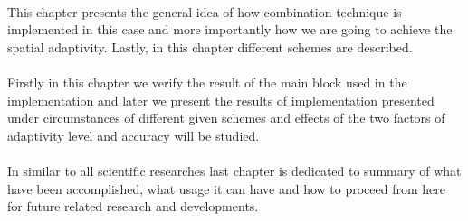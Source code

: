\\
\noindent  This chapter presents the general idea of how combination technique is implemented in this case and more importantly how we are going to achieve the spatial adaptivity. Lastly, in this chapter different schemes are described.  \\

\\
\noindent  Firstly in this chapter we verify the result of the main block used in the implementation and later we present the results of implementation presented under circumstances of different given schemes and effects of the two factors of adaptivity level and accuracy will be studied. \\

 \\
\noindent  In similar to all scientific researches last chapter is dedicated to summary of what have been accomplished, what usage it can have and how to proceed from here for future related research and developments.\\

